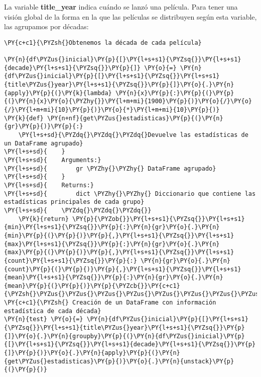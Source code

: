     La variable \textbf{title\_year} indica cuándo se lanzó una película.
Para tener una visión global de la forma en la que las películas se
distribuyen según esta variable, las agrupamos por décadas:

    \begin{tcolorbox}[breakable, size=fbox, boxrule=1pt, pad at break*=1mm,colback=cellbackground, colframe=cellborder]
\begin{Verbatim}[commandchars=\\\{\}]
\PY{c+c1}{\PYZsh{}Obtenemos la década de cada película}

\PY{n}{df\PYZus{}inicial}\PY{p}{[}\PY{l+s+s1}{\PYZsq{}}\PY{l+s+s1}{decade}\PY{l+s+s1}{\PYZsq{}}\PY{p}{]} \PY{o}{=} \PY{n}{df\PYZus{}inicial}\PY{p}{[}\PY{l+s+s1}{\PYZsq{}}\PY{l+s+s1}{title\PYZus{}year}\PY{l+s+s1}{\PYZsq{}}\PY{p}{]}\PY{o}{.}\PY{n}{apply}\PY{p}{(}\PY{k}{lambda} \PY{n}{x}\PY{p}{:}\PY{p}{(}\PY{p}{(}\PY{n}{x}\PY{o}{\PYZhy{}}\PY{l+m+mi}{1900}\PY{p}{)}\PY{o}{/}\PY{o}{/}\PY{l+m+mi}{10}\PY{p}{)}\PY{o}{*}\PY{l+m+mi}{10}\PY{p}{)}
\PY{k}{def} \PY{n+nf}{get\PYZus{}estadisticas}\PY{p}{(}\PY{n}{gr}\PY{p}{)}\PY{p}{:}
    \PY{l+s+sd}{\PYZdq{}\PYZdq{}\PYZdq{}Devuelve las estadísticas de un DataFrame agrupado}
\PY{l+s+sd}{    }
\PY{l+s+sd}{    Arguments:}
\PY{l+s+sd}{        gr \PYZhy{}\PYZhy{} DataFrame agrupado}
\PY{l+s+sd}{    }
\PY{l+s+sd}{    Returns:}
\PY{l+s+sd}{        dict \PYZhy{}\PYZhy{} Diccionario que contiene las estadísticas principales de cada grupo}
\PY{l+s+sd}{    \PYZdq{}\PYZdq{}\PYZdq{}}
    \PY{k}{return} \PY{p}{\PYZob{}}\PY{l+s+s1}{\PYZsq{}}\PY{l+s+s1}{min}\PY{l+s+s1}{\PYZsq{}}\PY{p}{:}\PY{n}{gr}\PY{o}{.}\PY{n}{min}\PY{p}{(}\PY{p}{)}\PY{p}{,}\PY{l+s+s1}{\PYZsq{}}\PY{l+s+s1}{max}\PY{l+s+s1}{\PYZsq{}}\PY{p}{:}\PY{n}{gr}\PY{o}{.}\PY{n}{max}\PY{p}{(}\PY{p}{)}\PY{p}{,}\PY{l+s+s1}{\PYZsq{}}\PY{l+s+s1}{count}\PY{l+s+s1}{\PYZsq{}}\PY{p}{:} \PY{n}{gr}\PY{o}{.}\PY{n}{count}\PY{p}{(}\PY{p}{)}\PY{p}{,}\PY{l+s+s1}{\PYZsq{}}\PY{l+s+s1}{mean}\PY{l+s+s1}{\PYZsq{}}\PY{p}{:}\PY{n}{gr}\PY{o}{.}\PY{n}{mean}\PY{p}{(}\PY{p}{)}\PY{p}{\PYZcb{}}\PY{c+c1}{\PYZsh{}\PYZus{}\PYZus{}\PYZus{}\PYZus{}\PYZus{}\PYZus{}\PYZus{}\PYZus{}\PYZus{}\PYZus{}\PYZus{}\PYZus{}\PYZus{}\PYZus{}\PYZus{}\PYZus{}\PYZus{}\PYZus{}\PYZus{}\PYZus{}\PYZus{}\PYZus{}\PYZus{}\PYZus{}\PYZus{}\PYZus{}\PYZus{}\PYZus{}\PYZus{}\PYZus{}\PYZus{}\PYZus{}\PYZus{}\PYZus{}\PYZus{}\PYZus{}\PYZus{}\PYZus{}\PYZus{}\PYZus{}\PYZus{}\PYZus{}\PYZus{}\PYZus{}\PYZus{}\PYZus{}\PYZus{}\PYZus{}\PYZus{}\PYZus{}\PYZus{}\PYZus{}\PYZus{}\PYZus{}\PYZus{}\PYZus{}\PYZus{}\PYZus{}\PYZus{}\PYZus{}\PYZus{}\PYZus{}}
\PY{c+c1}{\PYZsh{} Creación de un DataFrame con información estadística de cada década}
\PY{n}{test} \PY{o}{=} \PY{n}{df\PYZus{}inicial}\PY{p}{[}\PY{l+s+s1}{\PYZsq{}}\PY{l+s+s1}{title\PYZus{}year}\PY{l+s+s1}{\PYZsq{}}\PY{p}{]}\PY{o}{.}\PY{n}{groupby}\PY{p}{(}\PY{n}{df\PYZus{}inicial}\PY{p}{[}\PY{l+s+s1}{\PYZsq{}}\PY{l+s+s1}{decade}\PY{l+s+s1}{\PYZsq{}}\PY{p}{]}\PY{p}{)}\PY{o}{.}\PY{n}{apply}\PY{p}{(}\PY{n}{get\PYZus{}estadisticas}\PY{p}{)}\PY{o}{.}\PY{n}{unstack}\PY{p}{(}\PY{p}{)}
\end{Verbatim}
\end{tcolorbox}

